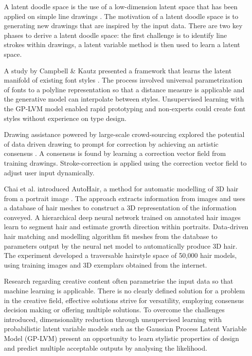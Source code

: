 \documentclass[ %
author={Dillon Keith Diep},
supervisor={Dr. Carl Henrik Ek},
degree={MEng},
title={ART-CG:},
subtitle={Assisted Real-time Content Generation of 3D Hair by Learning Manifolds},
type={Research},
year={2017} ]{dissertation}
\begin{document}
A latent doodle space is the use of a low-dimension latent space that has been applied on simple line drawings \cite{latentdoodle}. The motivation of a latent doodle space is to generating new drawings that are inspired by the input data. There are two key phases to derive a latent doodle space: the first challenge is to identify line strokes within drawings, a latent variable method is then used to learn a latent space.

A study by Campbell \& Kautz presented a framework that learns the latent manifold of existing font styles \cite{fontmanifold}. The process involved universal parametrization of fonts to a polyline representation so that a distance measure is applicable and the generative model can interpolate between styles. Unsupervised learning with the GP-LVM model enabled rapid prototyping and non-experts could create font styles without experience on type design.

Drawing assistance powered by large-scale crowd-sourcing explored the potential of data driven drawing to prompt for correction by achieving an artistic consensus \cite{drawingassistance}. A consensus is found by learning a correction vector field from training drawings. Stroke-correction is applied using the correction vector field to adjust user input dynamically.

Chai et al. introduced AutoHair, a method for automatic modelling of 3D hair from a portrait image \cite{autohair}. The approach extracts information from images and uses a database of hair meshes to construct a 3D representation of the information conveyed. A hierarchical deep neural network trained on annotated hair images learn to segment hair and estimate growth direction within portraits. Data-driven hair matching and modelling algorithm fit meshes from the database to parameters output by the neural net model to automatically produce 3D hair. The experiment developed a traversable hairstyle space of 50,000 hair models, using training images and 3D exemplars obtained from the internet.

Research regarding creative content often parametrise the input data so that machine learning is applicable. There is no clearly defined solution for a problem in the creative field, effective solutions strive for versatility, employing consensus decision making or offering multiple solutions. To overcome the challenges introduced, dimensionality reduction through unsupervised learning with probabilistic latent variable models such as the Gaussian Process Latent Variable Model (GP-LVM) \cite{gplvm} present an opportunity to learn stylistic properties of design and predict multiple acceptable outputs by analysing the likelihood.
\end{document}
